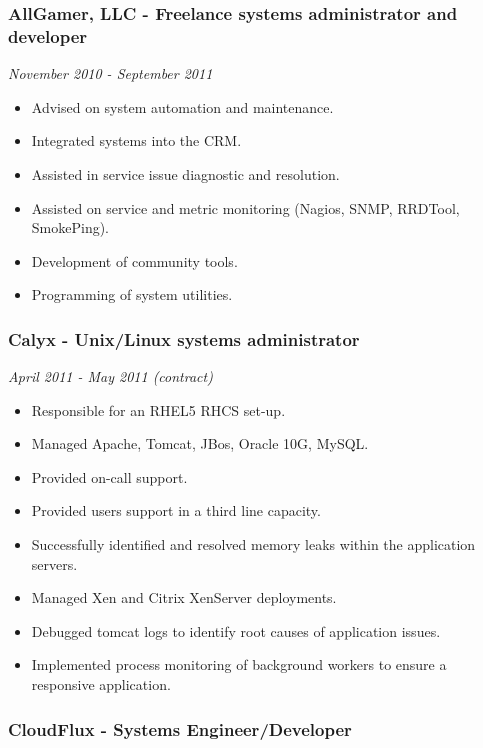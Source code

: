 \subsubsection{AllGamer, LLC - Freelance systems administrator and
developer}\label{allgamer-llc---freelance-systems-administrator-and-developer}

\emph{November 2010 - September 2011}

\begin{itemize}
\itemsep1pt\parskip0pt
\item
  Advised on system automation and maintenance.
\item
  Integrated systems into the CRM.
\item
  Assisted in service issue diagnostic and resolution.
\item
  Assisted on service and metric monitoring (Nagios, SNMP, RRDTool,
  SmokePing).
\item
  Development of community tools.
\item
  Programming of system utilities.
\end{itemize}

\subsubsection{Calyx - Unix/Linux systems
administrator}\label{calyx---unixlinux-systems-administrator}

\emph{April 2011 - May 2011 (contract)}

\begin{itemize}
\itemsep1pt\parskip0pt
\item
  Responsible for an RHEL5 RHCS set-up.
\item
  Managed Apache, Tomcat, JBos, Oracle 10G, MySQL.
\item
  Provided on-call support.
\item
  Provided users support in a third line capacity.
\item
  Successfully identified and resolved memory leaks within the
  application servers.
\item
  Managed Xen and Citrix XenServer deployments.
\item
  Debugged tomcat logs to identify root causes of application issues.
\item
  Implemented process monitoring of background workers to ensure a
  responsive application.
\end{itemize}

\subsubsection{CloudFlux - Systems
Engineer/Developer}\label{cloudflux---systems-engineerdeveloper}

